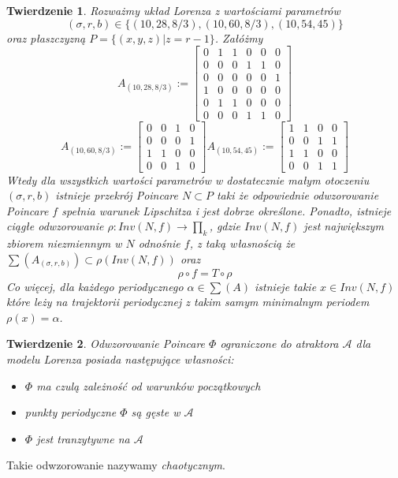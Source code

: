 \documentclass[12pt]{report}
\newtheorem{theorem}{Twierdzenie}
\begin{document}
	\begin{theorem}
		Rozważmy układ Lorenza z wartościami parametrów
			\[ (\sigma, r, b) \in \{(10, 28, 8/3), (10, 60, 8/3), (10, 54, 45)\} \]
		oraz płaszczyzną $P = \{(x, y, z) | z = r - 1\}$. Załóżmy
			\[ A_{(10,28,8/3)} := \begin{bmatrix}
									0 & 1 & 1 & 0 & 0 & 0 \\
									0 & 0 & 0 & 1 & 1 & 0 \\
									0 & 0 & 0 & 0 & 0 & 1 \\
									1 & 0 & 0 & 0 & 0 & 0 \\
									0 & 1 & 1 & 0 & 0 & 0 \\
									0 & 0 & 0 & 1 & 1 & 0
								\end{bmatrix}
			\]
			\[
			   A_{(10,60,8/3)} := \begin{bmatrix}
			   						0 & 0 & 1 & 0 \\
			   						0 & 0 & 0 & 1 \\
			   						1 & 1 & 0 & 0 \\
			   						0 & 0 & 1 & 0
			   					\end{bmatrix}
			   A_{(10,54,45)} := \begin{bmatrix}
			   						1 & 1 & 0 & 0 \\
			   						0 & 0 & 1 & 1 \\
			   						1 & 1 & 0 & 0 \\
			   						0 & 0 & 1 & 1
			   					\end{bmatrix}
			\]
		Wtedy dla wszystkich wartości parametrów w dostatecznie małym otoczeniu $(\sigma, r, b)$ istnieje przekrój Poincare $N \subset P$ taki że odpowiednie odwzorowanie Poincare $f$ spełnia warunek Lipschitza i jest dobrze określone. Ponadto, istnieje ciągłe odwzorowanie $\rho : Inv(N, f) \to \prod _k$, gdzie $Inv(N, f)$ jest największym zbiorem niezmiennym w $N$ odnośnie $f$, z taką własnością że $\sum (A_{(\sigma, r, b)}) \subset \rho (Inv(N, f))$ oraz
			\[ \rho \circ f = T \circ \rho \]
		Co więcej, dla każdego periodycznego $\alpha \in \sum (A)$ istnieje takie $x \in Inv(N, f)$ które leży na trajektorii periodycznej z takim samym minimalnym periodem $\rho (x) = \alpha$. \cite{MMS}
	\end{theorem}

	\begin{theorem}
		Odwzorowanie Poincare $\Phi$ ograniczone do atraktora $\mathcal{A}$ dla modelu Lorenza posiada następujące własności:
		\begin{itemize}
			\item $\Phi$ ma czulą zależność od warunków początkowych
			\item punkty periodyczne $\Phi$ są gęste w $\mathcal{A}$
			\item $\Phi$ jest tranzytywne na $\mathcal{A}$
		\end{itemize}
	\end{theorem}
	Takie odwzorowanie nazywamy \textit{chaotycznym}.
\end{document}
